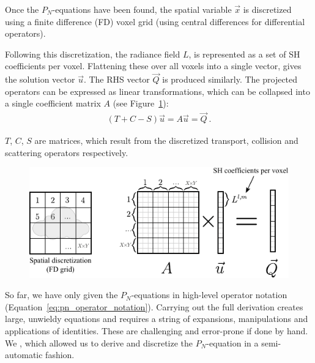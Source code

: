 Once the $P_N$-equations have been found, the spatial variable $\vec{x}$ is discretized using a finite difference (FD) voxel grid (using central differences for differential operators).

Following this discretization, the radiance field $L$, is represented as a set of SH coefficients per voxel. Flattening these over all voxels into a single vector, gives the solution vector $\vec{u}$. The RHS vector $\vec{Q}$ is produced similarly. The projected operators can be expressed as linear transformations, which can be collapsed into a single coefficient matrix $A$ (see Figure~\ref{fig:matrix_layout}):
\begin{align}
(T+C-S)\vec{u} = A\vec{u} = \vec{Q}
\ .
\end{align}

$T$, $C$, $S$ are matrices, which result from the discretized transport, collision and scattering operators respectively.

\begin{figure}[h]
\centering
\includegraphics[width=\columnwidth]{figures/fig_matrix_layout_small.pdf}
\vspace{-0.2in}
\label{fig:matrix_layout}
\end{figure}

So far, we have only given the $P_N$-equations in high-level operator notation (Equation~\ref{eq:pn_operator_notation}). Carrying out the full derivation creates large, unwieldy equations and requires a string of expansions, manipulations and applications of identities. These are challenging and error-prone if done by hand. We , which allowed us to derive and discretize the $P_N$-equation in a semi-automatic fashion.

